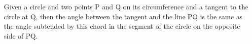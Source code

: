 Given a circle and two points P and Q on its circumference and a
tangent to the circle at Q, then the angle between the tangent and
the line PQ is the same as the angle subtended by this chord in the
segment of the circle on the opposite side of PQ.